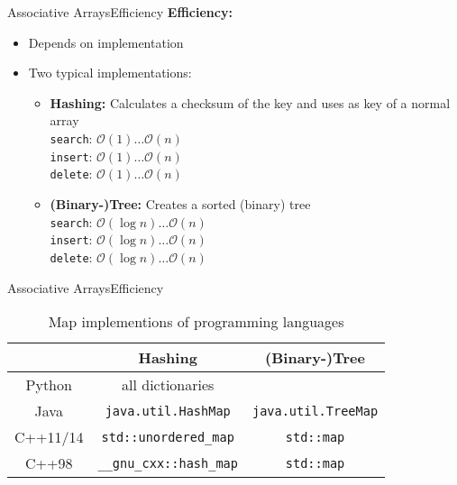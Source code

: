 
\begin{frame}{Associative Arrays}{Efficiency}
  \textbf{Efficiency:}
  \begin{itemize}
    \item
      Depends on implementation
    \item
      Two typical implementations:
      \begin{itemize}
        \item
          \textbf{Hashing:}
          Calculates a checksum of the key and uses as key of a normal array\\
          \texttt{search}: $\mathcal{O}(1) \dots \mathcal{O}(n)$\\
          \texttt{insert}: $\mathcal{O}(1) \dots \mathcal{O}(n)$\\
          \texttt{delete}: $\mathcal{O}(1) \dots \mathcal{O}(n)$
        \item
          \textbf{(Binary-)Tree:}
          Creates a sorted (binary) tree\\
          \texttt{search}: $\mathcal{O}(\log n) \dots \mathcal{O}(n)$\\
          \texttt{insert}: $\mathcal{O}(\log n) \dots \mathcal{O}(n)$\\
          \texttt{delete}: $\mathcal{O}(\log n) \dots \mathcal{O}(n)$
      \end{itemize}
  \end{itemize}
\end{frame}


\begin{frame}{Associative Arrays}{Efficiency}
  \begin{table}[!h]
    \caption{Map implementions of programming languages}
    \begin{tabular}{c|cc}
      {} & Hashing & (Binary-)Tree\\
      \midrule
      Python & all dictionaries & {}\\
      Java & \texttt{java.util.HashMap} & \texttt{java.util.TreeMap}\\
      C++11/14 & \texttt{std::unordered\_map} & \texttt{std::map}\\
      C++98 & \texttt{\_\_gnu\_cxx::hash\_map} & \texttt{std::map}
    \end{tabular}
  \end{table}
\end{frame}



